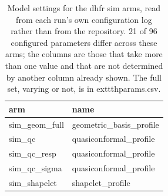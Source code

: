 \begin{table}[htbp]
\centering
\caption{Model settings for the dhfr sim arms, read from each run's own configuration log rather than from the repository. 21 of 96 configured parameters differ across these arms; the columns are those that take more than one value and that are not determined by another column already shown. The full set, varying or not, is in 	exttt{hparams.csv}.}
\label{tab:hyperparameters_dhfr_sim}
\small
\begin{tabular}{@{}l l@{}}
\toprule
{arm} & {name} \\
\midrule
{sim\_geom\_full} & {geometric\_basis\_profile} \\
{sim\_qc} & {quasiconformal\_profile} \\
{sim\_qc\_resp} & {quasiconformal\_profile} \\
{sim\_qc\_sigma} & {quasiconformal\_profile} \\
{sim\_shapelet} & {shapelet\_profile} \\
\bottomrule
\end{tabular}
\end{table}
